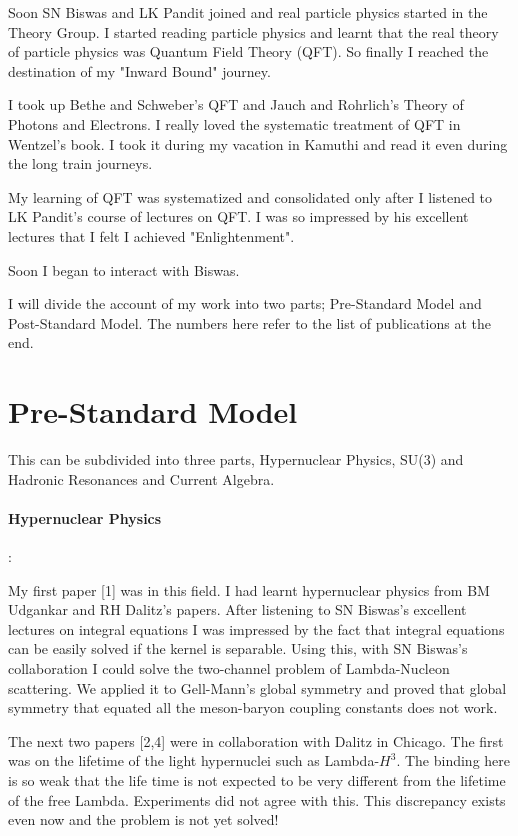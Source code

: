 Soon SN Biswas and LK Pandit joined and real particle physics started in 
the Theory Group. I started reading particle physics and learnt that the 
real theory of particle physics was Quantum Field Theory (QFT). So 
finally I reached the destination of my "Inward Bound" journey.

I took up Bethe and Schweber's QFT and Jauch and Rohrlich's Theory of 
Photons and Electrons. I really loved the systematic treatment of QFT in 
Wentzel's book. I took it during my vacation in Kamuthi and read it even 
during the long train journeys.

My learning of QFT was systematized and consolidated only after I 
listened to LK Pandit's course of lectures on QFT. I was so impressed by 
his excellent lectures that I felt I achieved "Enlightenment".

Soon I began to interact with Biswas.

I will divide the account of my work into two parts; Pre-Standard Model 
and Post-Standard Model. The numbers here refer to the list of 
publications at the end.

\section*{Pre-Standard Model}

This can be subdivided into three parts, Hypernuclear Physics,
SU(3) and Hadronic Resonances and Current Algebra.

\paragraph{Hypernuclear Physics}:

My first paper [1] was in this field. I had learnt hypernuclear physics 
from BM Udgankar and RH Dalitz's papers. After listening to SN Biswas's 
excellent lectures on integral equations I was impressed by the fact 
that integral equations can be easily solved if the kernel is separable. 
Using this, with SN Biswas's collaboration I could solve the two-channel 
problem of Lambda-Nucleon scattering. We applied it to Gell-Mann's 
global symmetry and proved that global symmetry that equated all the 
meson-baryon coupling constants does not work.

The next two papers [2,4] were in collaboration with Dalitz in Chicago. 
The first was on the lifetime of the light hypernuclei such as 
Lambda-$H^3$. The binding here is so weak that the life time is not 
expected to be very different from the lifetime of the free Lambda. 
Experiments did not agree with this. This discrepancy exists even now 
and the problem is not yet solved!

